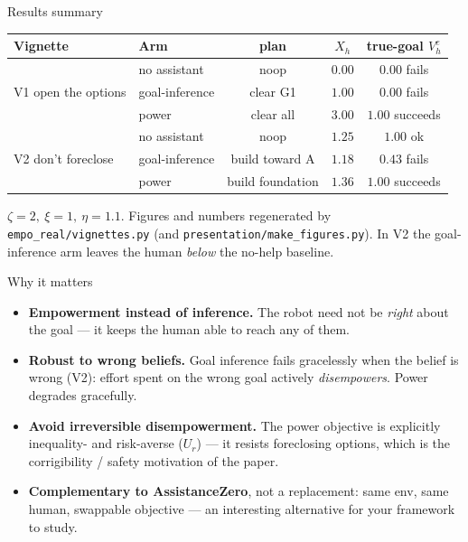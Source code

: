 \documentclass[aspectratio=169,10pt]{beamer}
\newcommand{\Power}[1]{\textcolor{cPower}{#1}}
\newcommand{\Goal}[1]{\textcolor{cGoal}{#1}}
\newcommand{\None}[1]{\textcolor{cNone}{#1}}
\newcommand{\Veh}{V^{e}_{h}}
\begin{document}
\begin{frame}{Results summary}
  \centering
  \begin{tabular}{llccc}
    \toprule
    Vignette & Arm & plan & $X_h$ & true-goal $\Veh$ \\
    \midrule
    \multirow{3}{*}{V1 open the options}
      & \None{no assistant}   & noop          & $0.00$ & \None{$0.00$ fails} \\
      & \Goal{goal-inference} & clear G1      & $1.00$ & \Goal{$0.00$ fails} \\
      & \Power{power}         & clear all     & $\mathbf{3.00}$ & \Power{$\mathbf{1.00}$ succeeds} \\
    \midrule
    \multirow{3}{*}{V2 don't foreclose}
      & \None{no assistant}   & noop              & $1.25$ & \None{$1.00$ ok} \\
      & \Goal{goal-inference} & build toward A    & $1.18$ & \Goal{$0.43$ fails} \\
      & \Power{power}         & build foundation  & $\mathbf{1.36}$ & \Power{$\mathbf{1.00}$ succeeds} \\
    \bottomrule
  \end{tabular}
  \vfill
  \footnotesize $\zeta=2,\ \xi=1,\ \eta=1.1$. Figures and numbers regenerated by
  \texttt{empo\_real/vignettes.py} (and \texttt{presentation/make\_figures.py}).
  In V2 the goal-inference arm leaves the human \emph{below} the no-help baseline.
\end{frame}

\begin{frame}{Why it matters}
  \begin{itemize}
    \item \textbf{Empowerment instead of inference.} The robot need not be
      \emph{right} about the goal --- it keeps the human able to reach any of them.
    \item \textbf{Robust to wrong beliefs.} Goal inference fails gracelessly when
      the belief is wrong (V2): effort spent on the wrong goal actively
      \emph{disempowers}. Power degrades gracefully.
    \item \textbf{Avoid irreversible disempowerment.} The power objective is
      explicitly inequality- and risk-averse ($U_r$) --- it resists foreclosing
      options, which is the corrigibility / safety motivation of the paper.
    \item \textbf{Complementary to AssistanceZero}, not a replacement: same env,
      same human, swappable objective --- an interesting alternative for your
      framework to study.
  \end{itemize}
\end{frame}
\end{document}
